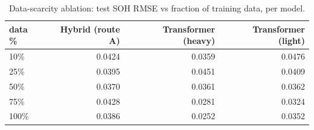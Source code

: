 \begin{table}
\caption{Data-scarcity ablation: test SOH RMSE vs fraction of training data, per model.}
\label{tab:ablation_scarcity_test_rmse}
\begin{tabular}{lrrr}
\toprule
data \% & Hybrid (route A) & Transformer (heavy) & Transformer (light) \\
\midrule
10\% & 0.0424 & 0.0359 & 0.0476 \\
25\% & 0.0395 & 0.0451 & 0.0409 \\
50\% & 0.0370 & 0.0361 & 0.0362 \\
75\% & 0.0428 & 0.0281 & 0.0324 \\
100\% & 0.0386 & 0.0252 & 0.0352 \\
\bottomrule
\end{tabular}
\end{table}
